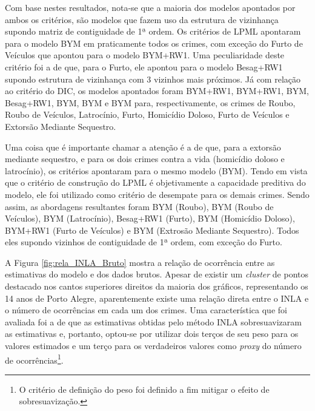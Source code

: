 \documentclass[12pt,openright,oneside,a4paper,english,french,spanish]{abntex2}
\numberwithin{table}{section} %
\numberwithin{figure}{section} %
\begin{document}
Com base nestes resultados, nota-se que a maioria dos modelos apontados por ambos os critérios, são modelos que fazem uso da estrutura de vizinhança supondo matriz de contiguidade de 1ª ordem. Os critérios de LPML apontaram para o modelo BYM em praticamente todos os crimes, com exceção do Furto de Veículos que apontou para o modelo BYM+RW1. Uma peculiaridade deste critério foi a de que, para o Furto, ele apontou para o modelo Besag+RW1 supondo estrutura de vizinhança com 3 vizinhos mais próximos. Já com relação ao critério do DIC, os modelos apontados foram BYM+RW1, BYM+RW1, BYM, Besag+RW1, BYM, BYM e BYM para, respectivamente, os crimes de Roubo, Roubo de Veículos, Latrocínio, Furto, Homicídio Doloso, Furto de Veículos e Extorsão Mediante Sequestro.

Uma coisa que é importante chamar a atenção é a de que, para a extorsão mediante sequestro, e para os dois crimes contra a vida (homicídio doloso e latrocínio), os critérios apontaram para o mesmo modelo (BYM). Tendo em vista que o critério de construção do LPML é objetivamente a capacidade preditiva do modelo, ele foi utilizado como critério de desempate para os demais crimes. Sendo assim, as abordagens resultantes foram BYM (Roubo), BYM (Roubo de Veículos), BYM (Latrocínio), Besag+RW1 (Furto), BYM (Homicídio Doloso), BYM+RW1 (Furto de Veículos) e BYM (Extrosão Mediante Sequestro). Todos eles supondo vizinhos de contiguidade de 1ª ordem, com exceção do Furto.


A Figura \ref{fig:rela_INLA_Bruto} mostra a relação de ocorrência entre as estimativas do modelo e dos dados brutos. Apesar de existir um \textit{cluster} de pontos destacado nos cantos superiores direitos da maioria dos gráficos, representando os 14 anos de Porto Alegre, aparentemente existe uma relação direta entre o INLA e o número de ocorrências em cada um dos crimes. Uma característica que foi avaliada foi a de que as estimativas obtidas pelo método INLA sobresuavizaram as estimativas e, portanto, optou-se por utilizar dois terços de seu peso para os valores estimados e um terço para os verdadeiros valores como \textit{proxy} do número de ocorrências\footnote{O critério de definição do peso foi definido a fim mitigar o efeito de sobresuavização.}.
\end{document}
